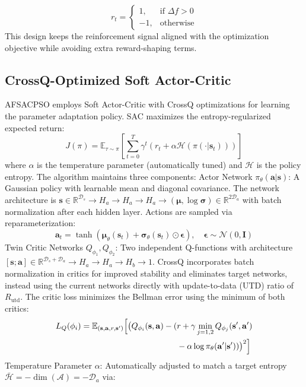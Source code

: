 \documentclass[final,5p,times]{elsarticle}
\newcommand{\symStatedim}{\mathcal{D}_s}
\newcommand{\symActiondim}{\mathcal{D}_a}
\newcommand{\symGamma}{\gamma}
\newcommand{\symHiddendimA}{H_a}
\newcommand{\symHiddendimB}{H_b}
\newcommand{\symUtd}{R_{\text{utd}}} %
\begin{document}
\begin{equation}
r_t =
\begin{cases}
1, & \text{if } \Delta f > 0 \\
-1, & \text{otherwise}
\end{cases}
\label{eq:reward_total}
\end{equation}
This design keeps the reinforcement signal aligned with the optimization objective while avoiding extra reward-shaping terms. \subsection{CrossQ-Optimized Soft Actor-Critic} AFSACPSO employs Soft Actor-Critic \cite{Haarnoja2018Soft} with CrossQ optimizations \cite{Bhatt2024CrossQ} for learning the parameter adaptation policy.
SAC maximizes the entropy-regularized expected return: \begin{equation}
J(\pi) = \mathbb{E}_{\tau \sim \pi}\left[\sum_{t=0}^{T} \gamma^t \left(r_t + \alpha \mathcal{H}(\pi(\cdot|\mathbf{s}_t))\right)\right]
\label{eq:sac_objective}
\end{equation} where $\alpha$ is the temperature parameter (automatically tuned) and $\mathcal{H}$ is the policy entropy.
The algorithm maintains three components: Actor Network $\pi_\theta(\mathbf{a}|\mathbf{s})$: A Gaussian policy with learnable mean and diagonal covariance. The network architecture is $\mathbf{s} \in \mathbb{R}^{\symStatedim} \to \symHiddendimA \to \symHiddendimA \to \symHiddendimA \to (\boldsymbol{\mu}, \log \boldsymbol{\sigma}) \in \mathbb{R}^{2\symActiondim}$ with batch normalization after each hidden layer. Actions are sampled via reparameterization:
\begin{equation}
\mathbf{a}_t = \tanh(\boldsymbol{\mu}_\theta(\mathbf{s}_t) + \boldsymbol{\sigma}_\theta(\mathbf{s}_t) \odot \boldsymbol{\epsilon}), \quad \boldsymbol{\epsilon} \sim \mathcal{N}(0, \mathbf{I})
\end{equation} Twin Critic Networks $Q_{\phi_1}, Q_{\phi_2}$: Two independent Q-functions with architecture $[\mathbf{s}; \mathbf{a}] \in \mathbb{R}^{\symStatedim + \symActiondim} \to \symHiddendimA \to \symHiddendimA \to \symHiddendimB \to 1$. CrossQ incorporates batch normalization in critics for improved stability and eliminates target networks, instead using the current networks directly with update-to-data (UTD) ratio of $\symUtd$. The critic loss minimizes the Bellman error using the minimum of both critics:
\begin{equation}
\begin{aligned}
L_Q(\phi_i) = \mathbb{E}_{(\mathbf{s},\mathbf{a},r,\mathbf{s}')} \Bigl[ \bigl(Q_{\phi_i}(\mathbf{s}, \mathbf{a}) - (&r + \symGamma \min_{j=1,2} Q_{\phi_j}(\mathbf{s}', \mathbf{a}') \\
&- \alpha \log \pi_\theta(\mathbf{a}'|\mathbf{s}') )\bigr)^2 \Bigr]
\end{aligned}
\end{equation} Temperature Parameter $\alpha$: Automatically adjusted to match a target entropy $\bar{\mathcal{H}} = -\dim(\mathcal{A}) = -\symActiondim$ via:
\end{document}
